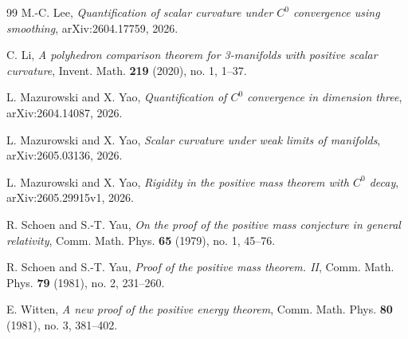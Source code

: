 \documentclass[11pt]{amsart}
\numberwithin{equation}{section}
\theoremstyle{definition}
\begin{document}
\begin{thebibliography}{99}
M.-C. Lee,
\emph{Quantification of scalar curvature under $C^0$ convergence using smoothing},
arXiv:2604.17759, 2026.

C. Li,
\emph{A polyhedron comparison theorem for 3-manifolds with positive scalar curvature},
Invent. Math. \textbf{219} (2020), no. 1, 1--37.

L. Mazurowski and X. Yao,
\emph{Quantification of $C^0$ convergence in dimension three},
arXiv:2604.14087, 2026.

L. Mazurowski and X. Yao,
\emph{Scalar curvature under weak limits of manifolds},
arXiv:2605.03136, 2026.

L. Mazurowski and X. Yao,
\emph{Rigidity in the positive mass theorem with $C^0$ decay},
arXiv:2605.29915v1, 2026.

R. Schoen and S.-T. Yau,
\emph{On the proof of the positive mass conjecture in general relativity},
Comm. Math. Phys. \textbf{65} (1979), no. 1, 45--76.

R. Schoen and S.-T. Yau,
\emph{Proof of the positive mass theorem. II},
Comm. Math. Phys. \textbf{79} (1981), no. 2, 231--260.

E. Witten,
\emph{A new proof of the positive energy theorem},
Comm. Math. Phys. \textbf{80} (1981), no. 3, 381--402.

\end{thebibliography}
\end{document}
